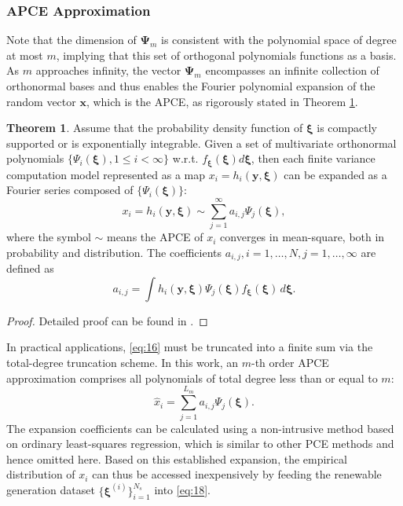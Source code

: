 \documentclass[journal]{IEEEtran}
\theoremstyle{definition}
\newtheorem{theorem}{Theorem}
\theoremstyle{remark}
\begin{document}
\subsubsection{APCE Approximation}
Note that the dimension of $\boldsymbol{\Psi}_m$ is consistent with the polynomial space of degree at most $m$, implying that this set of orthogonal polynomials functions as a basis. As $m$ approaches infinity, the vector $\boldsymbol{\Psi}_m$ encompasses an infinite collection of orthonormal bases and thus enables the Fourier polynomial expansion of the random vector $\boldsymbol{x}$, which is the APCE, as rigorously stated in Theorem \ref{the:1}.
\begin{theorem}\label{the:1}
Assume that the probability density function of $\boldsymbol{\xi}$ is compactly supported or is exponentially integrable. Given a set of multivariate orthonormal polynomials $\{\Psi_i(\boldsymbol{\xi}),1\leq i<\infty\}$ w.r.t. $f_{\boldsymbol{\xi}}(\boldsymbol{\xi})d\boldsymbol{\xi}$, then each finite variance computation model represented as a map $x_i=h_i(\boldsymbol{y},\boldsymbol{\xi})$ can be expanded as a Fourier series composed of $\{\Psi_i(\boldsymbol{\xi})\}$:  
\begin{equation}\label{eq:16}
    x_i=h_i(\boldsymbol{y},\boldsymbol{\xi})\sim \sum\limits_{j=1}^{\infty}a_{i,j}\Psi_j(\boldsymbol{\xi}),
\end{equation}
where the symbol $\sim$ means the APCE of $x_i$ converges in mean-square, both in probability and distribution.
The coefficients $a_{i,j},i=1,\dots,N,j=1,\dots,\infty$ are defined as
\begin{equation}
    a_{i,j}=\int h_i(\boldsymbol{y},\boldsymbol{\xi})\Psi_j(\boldsymbol{\xi})f_{\boldsymbol{\xi}}(\boldsymbol{\xi}) \, d\boldsymbol{\xi}.
\end{equation}
\end{theorem}
\begin{proof}
    Detailed proof can be found in \cite{rahman2018polynomial}.
\end{proof}\vspace{-5pt}
In practical applications, \eqref{eq:16} must be truncated into a finite sum via the total-degree truncation scheme. In this work, an $m$-th order APCE approximation comprises all polynomials of total degree less than or equal to $m$:
\begin{equation}\label{eq:18}
    \hat{x}_i=\sum\limits_{j=1}^{L_{m}}a_{i,j}\Psi_j(\boldsymbol{\xi}).
\end{equation}
The expansion coefficients can be calculated using a non-intrusive method based on ordinary least-squares regression, which is similar to other PCE methods and hence omitted here. Based on this established expansion, the empirical distribution of $x_i$ can thus be accessed inexpensively by feeding the renewable generation dataset $\{\boldsymbol{\xi}^{(i)}\}_{i=1}^{N_s}$ into \eqref{eq:18}.
\end{document}

